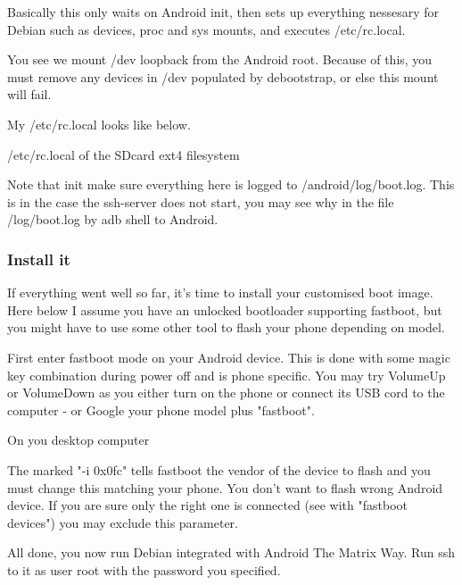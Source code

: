 Basically this only waits on Android init, then sets up everything nessesary for
Debian such as devices, proc and sys mounts, and executes /etc/rc.local.

You see we mount /dev loopback from the Android root. Because of this, you must
remove any devices in /dev populated by debootstrap, or else this mount will
fail.

My /etc/rc.local looks like below.

/etc/rc.local of the SDcard ext4 filesystem

% 
% 

Note that init make sure everything here is logged to /android/log/boot.log.
This is in the case the ssh-server does not start, you may see why in the file
/log/boot.log by adb shell to Android.

\subsubsection{Install it}

If everything went well so far, it's time to install your customised boot image.
Here below I assume you have an unlocked bootloader supporting fastboot, but you
might have to use some other tool to flash your phone depending on model.

First enter fastboot mode on your Android device. This is done with some magic
key combination during power off and is phone specific. You may try VolumeUp or
VolumeDown as you either turn on the phone or connect its USB cord to the
computer - or Google your phone model plus "fastboot".

On you desktop computer


The marked "-i 0x0fc" tells fastboot the vendor of the device to flash and you
must change this matching your phone. You don't want to flash wrong Android
device. If you are sure only the right one is connected (see with "fastboot
devices") you may exclude this parameter.

All done, you now run Debian integrated with Android The Matrix Way. Run ssh to
it as user root with the password you specified.

